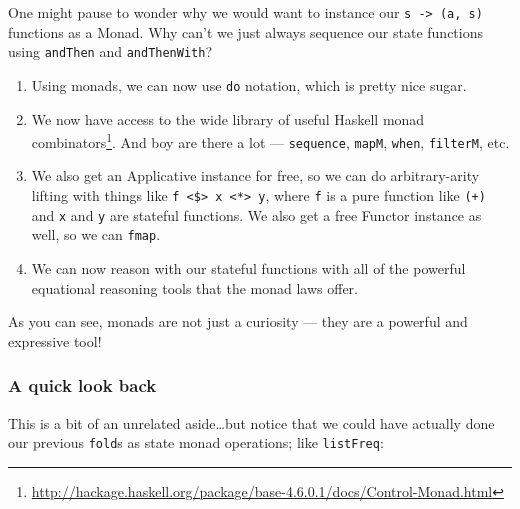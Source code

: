 \documentclass[]{article}
\renewcommand{\href}[2]{#2\footnote{\url{#1}}}
\begin{document}
One might pause to wonder why we would want to instance our
\texttt{s\ -\textgreater{}\ (a,\ s)} functions as a Monad. Why can't we just
always sequence our state functions using \texttt{andThen} and
\texttt{andThenWith}?

\begin{enumerate}
\def\labelenumi{\arabic{enumi}.}
\item
  Using monads, we can now use \texttt{do} notation, which is pretty nice sugar.
\item
  We now have access to the wide library of useful Haskell
  \href{http://hackage.haskell.org/package/base-4.6.0.1/docs/Control-Monad.html}{monad
  combinators}. And boy are there a lot --- \texttt{sequence}, \texttt{mapM},
  \texttt{when}, \texttt{filterM}, etc.
\item
  We also get an Applicative instance for free, so we can do arbitrary-arity
  lifting with things like
  \texttt{f\ \textless{}\$\textgreater{}\ x\ \textless{}*\textgreater{}\ y},
  where \texttt{f} is a pure function like \texttt{(+)} and \texttt{x} and
  \texttt{y} are stateful functions. We also get a free Functor instance as
  well, so we can \texttt{fmap}.
\item
  We can now reason with our stateful functions with all of the powerful
  equational reasoning tools that the monad laws offer.
\end{enumerate}

As you can see, monads are not just a curiosity --- they are a powerful and
expressive tool!

\hypertarget{a-quick-look-back}{%
\subsubsection{A quick look back}\label{a-quick-look-back}}

This is a bit of an unrelated aside\ldots but notice that we could have actually
done our previous \texttt{fold}s as state monad operations; like
\texttt{listFreq}:
\end{document}
